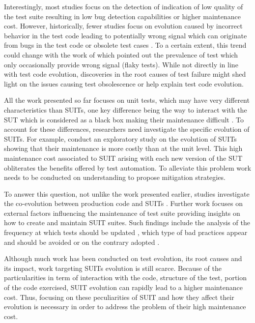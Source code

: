 Interestingly, most studies focus on the detection of indication of low quality of the test suite resulting in low bug detection capabilities or higher maintenance cost. However, historically, fewer studies focus on evolution caused by incorrect behavior in the test code leading to potentially wrong signal which can originate from bugs in the test code \cite{Vahabzadeh2015} or obsolete test cases \cite{Hao2013, Tang2015}. To a certain extent, this trend could change with the work of \textcite{Luo2014} which pointed out the prevalence of test which only occasionally provide wrong signal (flaky tests). While not directly in line with test code evolution, discoveries in the root causes of test failure might shed light on the issues causing test obsolescence or help explain test code evolution.

All the work presented so far focuses on unit tests, which may have very different characteristics than SUITs, one key difference being the way to interact with the SUT which is considered as a black box making their maintenance difficult \cite{Berner2005}. To account for these differences, researchers need investigate the specific evolution of SUITs. For example, \textcite{Skoglund2004} conduct an exploratory study on the evolution of SUITs showing that their maintenance is more costly than at the unit level. This high maintenance cost associated to SUIT arising with each new version of the SUT obliterates the benefits offered by test automation. To alleviate this problem work needs to be conducted on understanding to propose mitigation strategies.

To answer this question, not unlike the work presented earlier, studies investigate the co-evolution between production code and SUITs \cite{Shewchuk2010, Christophe2014}. Further work focuses on external factors influencing the maintenance of test suite \cite{Alegroth2013, Kan2013, Alegroth2016, Lavoie2017} providing insights on how to create and maintain SUIT suites. Such findings include the analysis of the frequency at which tests should be updated \cite{Alegroth2013, Alegroth2016}, which type of bad practices appear and should be avoided \cite{Chen2012, Lavoie2017} or on the contrary adopted \cite{Kan2013}.

Although much work has been conducted on test evolution, its root causes and its impact, work targeting SUITs evolution is still scarce. Because of the particularities in term of interaction with the code, structure of the test, portion of the code exercised, SUIT evolution can rapidly lead to a higher maintenance cost. Thus, focusing on these peculiarities of SUIT and how they affect their evolution is necessary in order to address the problem of their high maintenance cost.

